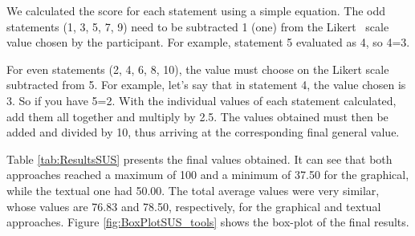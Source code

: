 We calculated the score for each statement using a simple equation.
The odd statements (1, 3, 5, 7, 9) need to be subtracted 1 (one) from the Likert~\cite{Likert} scale value chosen by the participant.
For example, statement 5 evaluated as 4, so 4=3.

For even statements (2, 4, 6, 8, 10), the value must choose on the Likert scale subtracted from 5.
For example, let's say that in statement 4, the value chosen is 3.
So if you have 5=2.
With the individual values of each statement calculated, add them all together and multiply by 2.5.
The values obtained must then be added and divided by 10, thus arriving at the corresponding final general value.

Table \ref{tab:ResultsSUS} presents the final values obtained.
It can see that both approaches reached a maximum of 100 and a minimum of 37.50 for the graphical, while the textual one had 50.00.
The total average values were very similar, whose values are 76.83 and 78.50, respectively, for the graphical and textual approaches.
Figure \ref{fig:BoxPlotSUS_tools} shows the box-plot of the final results.

